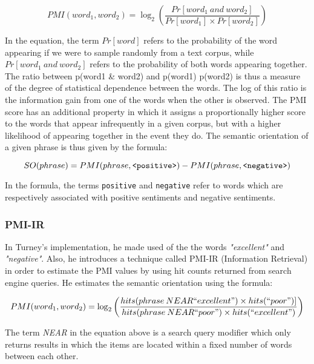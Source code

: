 \documentclass[11pt]{report} %
\begin{document}
\begin{equation*} PMI(word_1, word_2) = \log_2 \left(\frac{Pr[word_1 \: and \: word_2]}{Pr[word_1] \times Pr[word_2]}\right) \end{equation*}

In the equation, the term $Pr[word]$ refers to the probability of the word appearing if we were to sample randomly from a text corpus, while  $Pr[word_1 \: and \: word_2]$ refers to the probability of both words appearing together. The ratio between p(word1 \& word2) and p(word1) p(word2) is thus a measure of the degree of statistical dependence between the words. The log of this ratio is the information gain from one of the words when the other is observed. The PMI score has an additional property in which it assigns a proportionally higher score to the words that appear infrequently in a given corpus, but with a higher likelihood of appearing together in the event they do\cite{Vargas2010}. The semantic orientation of a given phrase is thus given by the formula:

\begin{equation*} SO(phrase) = PMI(phrase, \verb|<positive>|) - PMI(phrase, \verb|<negative>|)\end{equation*}

In the formula, the terms \verb|positive| and \verb|negative| refer to words which are respectively associated with positive sentiments and negative sentiments. 

\subsubsection{PMI-IR}
In Turney's implementation, he made used of the the words \textit{"excellent"} and \textit{"negative"}. Also, he introduces a technique called PMI-IR (Information Retrieval) in order to estimate the PMI values by using hit counts returned from search engine queries. He estimates the semantic orientation using the formula:

\begin{equation*} PMI(word_1, word_2) = \log_2 \left(\frac{hits(phrase \: NEAR ``excellent") \times hits(``poor") ]}{hits(phrase \: NEAR ``poor") \times hits(``excellent") }\right) \end{equation*}

The term \textit{NEAR} in the equation above is a search query modifier which only returns results in which the items are located within a fixed number of words between each other. 
\end{document}
